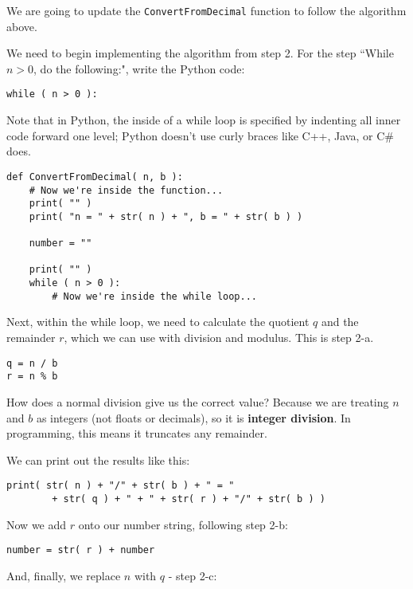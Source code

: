 \documentclass[a4paper,12pt]{book}
\begin{document}
        We are going to update the \texttt{ConvertFromDecimal}
        function to follow the algorithm above.

    \newpage

    We need to begin implementing the algorithm from step 2.
    For the step ``While $n > 0$, do the following:", write the Python
    code:

\begin{verbatim}
while ( n > 0 ):
\end{verbatim}

    Note that in Python, the inside of a while loop is specified by
    indenting all inner code forward one level; Python doesn't use
    curly braces like C++, Java, or C\# does.
    
\begin{lstlisting}[style=pycode]
def ConvertFromDecimal( n, b ):
    # Now we're inside the function...
    print( "" )
    print( "n = " + str( n ) + ", b = " + str( b ) )

    number = ""

    print( "" )
    while ( n > 0 ):
        # Now we're inside the while loop...
\end{lstlisting}

    Next, within the while loop, we need to calculate the quotient $q$
    and the remainder $r$, which we can use with division and modulus.
    This is step 2-a.

\begin{verbatim}
q = n / b
r = n % b
\end{verbatim}

    How does a normal division give us the correct value? Because
    we are treating $n$ and $b$ as integers (not floats or decimals),
    so it is \textbf{integer division}. In programming, this means
    it truncates any remainder.

    We can print out the results like this:

\begin{verbatim}
print( str( n ) + "/" + str( b ) + " = "
        + str( q ) + " + " + str( r ) + "/" + str( b ) )
\end{verbatim}

    Now we add $r$ onto our number string, following step 2-b:

\begin{verbatim}
number = str( r ) + number
\end{verbatim}

    And, finally, we replace $n$ with $q$ - step 2-c:
\end{document}
